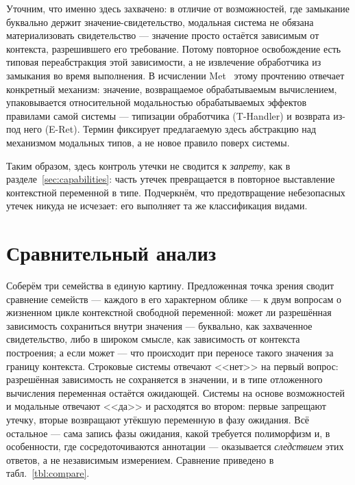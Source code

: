 \documentclass{ProcISPRAS}
\begin{document}
Уточним, что именно здесь захвачено: в
отличие от возможностей, где замыкание буквально держит значение-свидетельство,
модальная система не обязана материализовать свидетельство --- значение просто остаётся
зависимым от контекста, разрешившего его требование. Потому повторное освобождение есть
типовая переабстракция этой зависимости, а не извлечение обработчика из замыкания во
время выполнения. В исчислении Met~\cite{tang2025modal} этому прочтению отвечает
конкретный механизм: значение, возвращаемое обрабатываемым вычислением, упаковывается
относительной модальностью обрабатываемых эффектов правилами самой системы --- типизации
обработчика (T-Handler) и возврата из-под него (E-Ret). Термин фиксирует предлагаемую
здесь абстракцию над механизмом модальных типов, а не новое правило поверх системы.

Таким образом, здесь контроль утечки не сводится к \emph{запрету}, как в
разделе~\ref{sec:capabilities}: часть утечек превращается в повторное выставление
контекстной переменной в типе. Подчеркнём, что предотвращение
небезопасных утечек никуда не исчезает: его выполняет та же классификация видами.


\section{Сравнительный анализ}
\label{sec:comparison}

Соберём три семейства в единую картину. Предложенная точка зрения сводит сравнение
семейств --- каждого в его характерном облике --- к
двум вопросам о жизненном цикле контекстной свободной переменной: может ли разрешённая
зависимость сохраниться внутри значения --- буквально, как захваченное свидетельство,
либо в широком смысле, как зависимость от контекста построения; а если может --- что
происходит при переносе такого значения за границу контекста. Строковые системы отвечают <<нет>> на первый
вопрос: разрешённая зависимость не сохраняется в значении, и в типе отложенного
вычисления переменная остаётся ожидающей. Системы на основе возможностей и
модальные отвечают <<да>> и расходятся во втором: первые запрещают утечку, вторые
возвращают утёкшую переменную в фазу ожидания. Всё остальное --- сама запись фазы
ожидания, какой требуется полиморфизм и, в особенности, где
сосредоточиваются аннотации --- оказывается \emph{следствием} этих ответов, а не
независимым измерением. Сравнение приведено в табл.~\ref{tbl:compare}.
\end{document}
